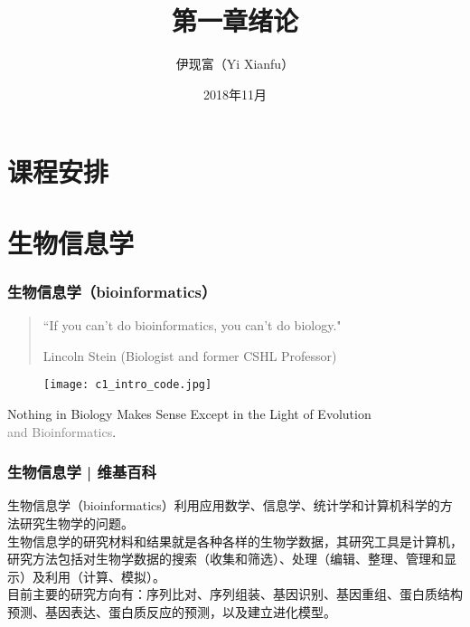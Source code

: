 



\title[绪论]{第一章\quad 绪论}
\author[Yixf]{伊现富（Yi Xianfu）}
\date{2018年11月}



\section{课程安排}


\section{生物信息学}
\begin{frame}
  \frametitle{生物信息学（bioinformatics）}
  \begin{quotation}
    ``If you can't do bioinformatics, you can't do biology."
    \begin{flushright}
    Lincoln Stein (Biologist and former CSHL Professor)
  \end{flushright}
  \end{quotation}
  \vspace{-1.5em}
  \begin{figure}
    \centering
    \texttt{[image: c1\_intro\_code.jpg]}
  \end{figure}
  \vspace{-1.5em}
  Nothing in Biology Makes Sense Except in the Light of Evolution\\ \textcolor{gray}{and Bioinformatics}.
\end{frame}

\begin{frame}
  \frametitle{生物信息学 | 维基百科}
生物信息学（bioinformatics）利用应用数学、信息学、统计学和计算机科学的方法研究生物学的问题。\\
  \vspace{1em}
生物信息学的\alert{研究材料和结果}就是各种各样的生物学数据，其\alert{研究工具}是计算机，\alert{研究方法}包括对生物学数据的搜索（收集和筛选）、处理（编辑、整理、管理和显示）及利用（计算、模拟）。\\
  \vspace{1em}
  目前主要的研究方向有：序列比对、序列组装、基因识别、基因重组、蛋白质结构预测、基因表达、蛋白质反应的预测，以及建立进化模型。\\
\end{frame}

